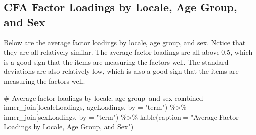 \documentclass[
  letterpaper,
  DIV=11,
  numbers=noendperiod]{scrartcl}
\newenvironment{Shaded}{\begin{snugshade}}{\end{snugshade}}
\newcommand{\AttributeTok}[1]{\textcolor[rgb]{0.40,0.45,0.13}{#1}}
\newcommand{\CommentTok}[1]{\textcolor[rgb]{0.37,0.37,0.37}{#1}}
\newcommand{\FunctionTok}[1]{\textcolor[rgb]{0.28,0.35,0.67}{#1}}
\newcommand{\NormalTok}[1]{\textcolor[rgb]{0.00,0.23,0.31}{#1}}
\newcommand{\SpecialCharTok}[1]{\textcolor[rgb]{0.37,0.37,0.37}{#1}}
\newcommand{\StringTok}[1]{\textcolor[rgb]{0.13,0.47,0.30}{#1}}
\begin{document}
\subsection{CFA Factor Loadings by Locale, Age Group, and
Sex}\label{cfa-factor-loadings-by-locale-age-group-and-sex}

Below are the average factor loadings by locale, age group, and sex.
Notice that they are all relatively similar. The average factor loadings
are all above 0.5, which is a good sign that the items are measuring the
factors well. The standard deviations are also relatively low, which is
also a good sign that the items are measuring the factors well.

\begin{Shaded}
\begin{Highlighting}[]
\CommentTok{\# Average factor loadings by locale, age group, and sex combined}
\FunctionTok{inner\_join}\NormalTok{(localeLoadings, ageLoadings, }\AttributeTok{by =} \StringTok{"term"}\NormalTok{) }\SpecialCharTok{\%\textgreater{}\%}
  \FunctionTok{inner\_join}\NormalTok{(sexLoadings, }\AttributeTok{by =} \StringTok{"term"}\NormalTok{) }\SpecialCharTok{\%\textgreater{}\%}
  \FunctionTok{kable}\NormalTok{(}\AttributeTok{caption =} \StringTok{"Average Factor Loadings by Locale, Age Group, and Sex"}\NormalTok{)}
\end{Highlighting}
\end{Shaded}
\end{document}

